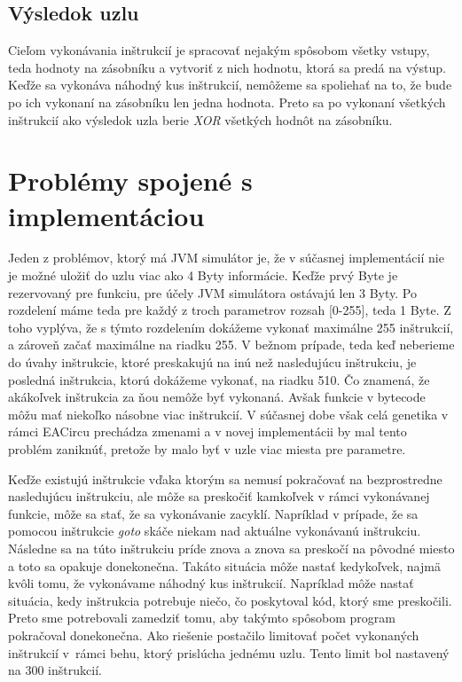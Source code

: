 \subsection{Výsledok uzlu}

Cieľom vykonávania inštrukcií je spracovať nejakým spôsobom všetky vstupy, teda hodnoty na zásobníku a vytvoriť z nich hodnotu, ktorá sa predá na výstup. Keďže sa vykonáva náhodný kus inštrukcií, nemôžeme sa spoliehať na to, že bude po ich vykonaní na zásobníku len jedna hodnota. Preto sa po vykonaní všetkých inštrukcií ako výsledok uzla berie \textit{XOR} všetkých hodnôt na zásobníku. 

\section{Problémy spojené s implementáciou}
\label{sec:problems}

Jeden z problémov, ktorý má JVM simulátor je, že v súčasnej implementácií nie je možné uložiť do uzlu viac ako 4 Byty informácie. Keďže prvý Byte je rezervovaný pre funkciu, pre účely JVM simulátora ostávajú len 3 Byty. Po rozdelení máme teda pre každý z troch parametrov rozsah [0-255], teda 1 Byte. Z toho vyplýva, že s týmto rozdelením dokážeme vykonať maximálne 255 inštrukcií, a zároveň začať maximálne na riadku 255. V bežnom prípade, teda keď neberieme do úvahy inštrukcie, ktoré preskakujú na inú než nasledujúcu inštrukciu, je posledná inštrukcia, ktorú dokážeme vykonať, na riadku 510. Čo znamená, že akákoľvek inštrukcia za ňou nemôže byť vykonaná. Avšak funkcie v bytecode môžu mať niekoľko násobne viac inštrukcií. V súčasnej dobe však celá genetika v rámci EACircu prechádza zmenami a v novej implementácii by mal tento problém zaniknúť, pretože by malo byť v uzle viac miesta pre parametre.

Keďže existujú inštrukcie vďaka ktorým sa nemusí pokračovať na bezprostredne nasledujúcu inštrukciu, ale môže sa preskočiť kamkoľvek v rámci vykonávanej funkcie, môže sa stať, že sa vykonávanie zacyklí. Napríklad v prípade, že sa pomocou inštrukcie \textit{goto} skáče niekam nad aktuálne vykonávanú inštrukciu. Následne sa na túto inštrukciu príde znova a znova sa preskočí na pôvodné miesto a toto sa opakuje donekonečna. Takáto situácia môže nastať kedykoľvek, najmä kvôli tomu, že vykonávame náhodný kus inštrukcií. Napríklad môže nastať situácia, kedy inštrukcia potrebuje niečo, čo poskytoval kód, ktorý sme preskočili. Preto sme potrebovali zamedziť tomu, aby takýmto spôsobom program pokračoval donekonečna. Ako riešenie postačilo limitovať počet vykonaných inštrukcií v~rámci behu, ktorý prislúcha jednému uzlu. Tento limit bol nastavený na 300 inštrukcií.

